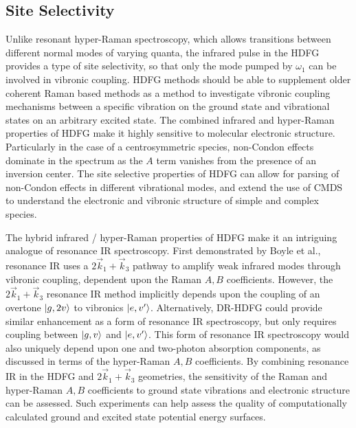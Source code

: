 \documentclass[aip, jcp, reprint, onecolumn]{revtex4-2}
\begin{document}
\subsection{Site Selectivity}
Unlike resonant hyper-Raman spectroscopy, which allows transitions between different normal modes of varying quanta, the infrared pulse in the HDFG provides a type of site selectivity,\cite{RN103, Carlson1991} so that only the mode pumped by $\omega_1$ can be involved in vibronic coupling.
HDFG methods should be able to supplement older coherent Raman based methods as a method to investigate vibronic coupling mechanisms between a specific vibration on the ground state and vibrational states on an arbitrary excited state.\cite{RN103}
The combined infrared and hyper-Raman properties of HDFG make it highly sensitive to molecular electronic structure.
Particularly in the case of a centrosymmetric species, non-Condon effects dominate in the spectrum as the $A$ term vanishes from the presence of an inversion center.
The site selective properties of HDFG can allow for parsing of non-Condon effects in different vibrational modes, and extend the use of CMDS to understand the electronic and vibronic structure of simple and complex species.

The hybrid infrared / hyper-Raman properties of HDFG make it an intriguing analogue of resonance IR spectroscopy.
First demonstrated by Boyle et al., resonance IR uses a $2\vec{k}_1 + \vec{k}_3$ pathway to amplify weak infrared modes through vibronic coupling, dependent upon the Raman $A,B$ coefficients. \cite{RN491}
However, the $2\vec{k}_1 + \vec{k}_3$ resonance IR method implicitly depends upon the coupling of an overtone $\ket{g,2v}$ to vibronics $\ket{e,v'}$.
Alternatively, DR-HDFG could provide similar enhancement as a form of resonance IR spectroscopy, but only requires coupling between $\ket{g,v}$ and $\ket{e,v'}$. 
This form of resonance IR spectroscopy would also uniquely depend upon one and two-photon absorption components, as discussed in terms of the hyper-Raman $A,B$ coefficients.
By combining resonance IR in the HDFG and $2\vec{k}_1 + \vec{k}_3$ geometries, the sensitivity of the Raman and hyper-Raman $A,B$ coefficients to ground state vibrations and electronic structure can be assessed. 
Such experiments can help assess the quality of computationally calculated ground and excited state potential energy surfaces. 
\end{document}
